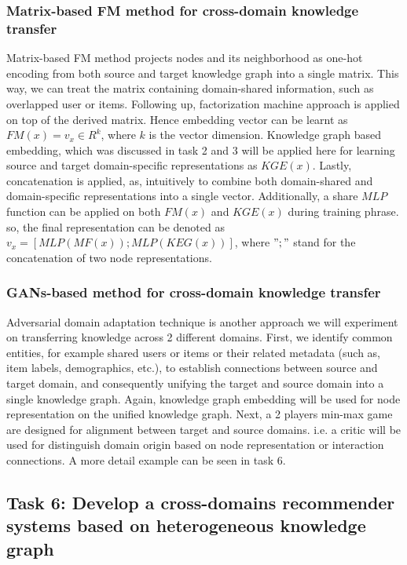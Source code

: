 \subsubsection*{Matrix-based FM method for cross-domain knowledge transfer}
Matrix-based FM method projects nodes and its neighborhood as one-hot encoding from both source and target knowledge graph into a single matrix. This way, we can treat the matrix containing domain-shared information, such as overlapped user or items. Following up, factorization machine approach is applied on top of the derived matrix. Hence embedding vector can be learnt as $FM(x) = v_x \in R^k$, where $k$ is the vector dimension. Knowledge graph based embedding, which was discussed in task 2 and 3 will be applied here for learning source and target domain-specific representations as $KGE(x)$.
Lastly, concatenation is applied, as, intuitively to combine both domain-shared and domain-specific representations into a single vector.
Additionally, a share $MLP$ function can be applied on both $FM(x)$ and $KGE(x)$ during training phrase. so, the final representation can be denoted as $v_x = [MLP(MF(x));MLP(KEG(x))]$, where $";"$ stand for the concatenation of two node representations.

\subsubsection*{GANs-based method for cross-domain knowledge transfer}
Adversarial domain adaptation technique is another approach we will experiment on transferring knowledge across 2 different domains.
First, we identify common entities, for example shared users or items or their related metadata (such as, item labels, demographics, etc.), to establish connections between source and target domain, and consequently unifying the target and source domain into a single knowledge graph.
Again, knowledge graph embedding will be used for node representation on the unified knowledge graph. Next, a 2 players min-max game are designed for alignment between target and source domains. i.e. a critic will be used for distinguish domain origin based on node representation or interaction connections. A more detail example can be seen in task 6.


\subsection*{Task 6: Develop a cross-domains recommender systems based on heterogeneous knowledge graph}

